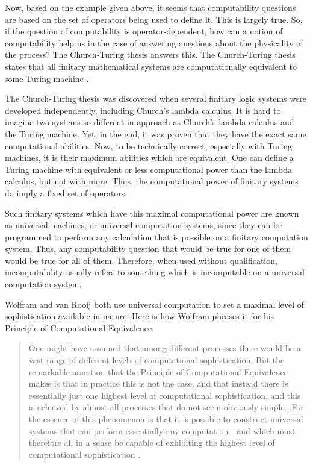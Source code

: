 Now, based on the example given above, it seems that computability questions are based on the set of operators being used to define it.  This is largely true.  So, if the question of computability is operator-dependent, how can a notion of computability help us in the case of answering questions about the physicality of the process?  The Church-Turing thesis answers this.  The Church-Turing thesis states that all finitary mathematical systems are computationally equivalent to some Turing machine \citep{turing1939}.    

The Church-Turing thesis was discovered when several finitary logic systems were developed independently, including Church's lambda calculus.  It is hard to imagine two systems so different in approach as Church's lambda calculus and the Turing machine.  Yet, in the end, it was proven that they have the exact same computational abilities.  Now, to be technically correct, especially with Turing machines, it is their maximum abilities which are equivalent.  One can define a Turing machine with equivalent or less computational power than the lambda calculus, but not with more.  Thus, the computational power of finitary systems do imply a fixed set of operators.  

Such finitary systems which have this maximal computational power are known as universal machines, or universal computation systems, since they can be programmed to perform any calculation that is possible on a finitary computation system.  Thus, any computability question that would be true for one of them would be true for all of them.  Therefore, when used without qualification, incomputability usually refers to something which is incomputable on a universal computation system.

Wolfram and van Rooij both use universal computation to set a maximal level of sophistication available in nature.  Here is how Wolfram phrases it for his Principle of Computational Equivalence:

\begin{quote}
One might have assumed that among different processes there would be a vast range of different levels of computational sophistication.  But the remarkable assertion that the Principle of Computational Equivalence makes is that in practice this is not the case, and that instead there is essentially just one highest level of computational sophistication, and this is achieved by almost all processes that do not seem obviously simple...For the essence of this phenomenon is that it is possible to construct universal systems that can perform essentially any computation---and which must therefore all in a sense be capable of exhibiting the highest level of computational sophistication \citep[][pg. 717]{wolfram2002}.
\end{quote}

